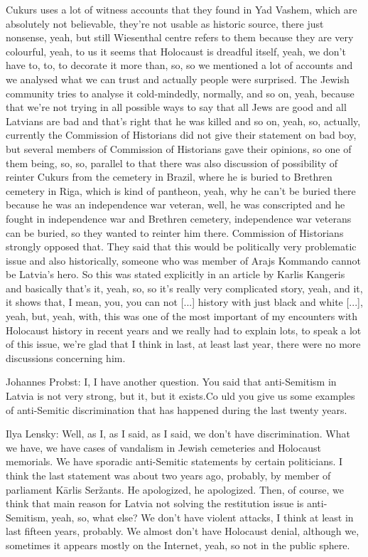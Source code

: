 Cukurs uses a lot of witness accounts that they found in Yad Vashem, which are absolutely not believable, they're not usable as historic source, there just nonsense, yeah, but still Wiesenthal centre refers to them because they are very colourful, yeah, to us it seems that Holocaust is dreadful itself, yeah, we don't have to, to, to decorate it more than, so, so we mentioned a lot of accounts and we analysed what we can trust and actually people were surprised. The Jewish community tries to analyse it cold-mindedly, normally, and so on, yeah, because that we're not trying in all possible ways to say that all Jews are good and all Latvians are bad and that's right that he was killed and so on, yeah, so, actually, currently the Commission of Historians did not give their  statement on bad boy, but several members of Commission of Historians gave their opinions, so one of them being, so, so,  parallel to that there was also discussion of possibility of reinter Cukurs from the cemetery in Brazil, where he is buried to Brethren cemetery in Riga, which is kind of pantheon, yeah, why he can't be buried there because he was an independence war veteran, well, he was conscripted and he fought in independence war and Brethren cemetery, independence war veterans can be buried, so they wanted to reinter him there. Commission of Historians strongly opposed that. They said that this would be politically very problematic issue and also historically, someone who was member of Arajs Kommando cannot be Latvia's hero. So this was stated explicitly in an article by Karlis Kangeris and basically that's it,  yeah, so, so it's really very complicated story, yeah, and it, it shows that, I mean, you, you can not [...] history with just black and white [...], yeah, but, yeah, with, this was one of the most important of my encounters with Holocaust history in recent years and we really had to explain lots, to speak a lot of this issue, we’re glad that I think in last, at least last year, there were no more discussions concerning him. 

Johannes Probst: I, I have another question. 
You said that anti-Semitism in Latvia is not very strong, but it, but it exists.Co uld you give us some examples of anti-Semitic discrimination that has happened during the last twenty years. 

Ilya Lensky: Well, as I, as I said, as I said, we don’t have discrimination. What we have, we have cases of vandalism in Jewish cemeteries and Holocaust memorials. We have sporadic anti-Semitic statements by certain politicians. I think the last statement was about two years ago, probably, by member of parliament Kārlis Seržants. He apologized, he apologized. Then, of course, we think that main reason for Latvia not solving the restitution issue is anti-Semitism, yeah, so, what else? We don’t have violent attacks, I think at least in last fifteen years, probably. We almost don’t have Holocaust denial, although we, sometimes it appears mostly on the Internet, yeah, so not in the public sphere.

